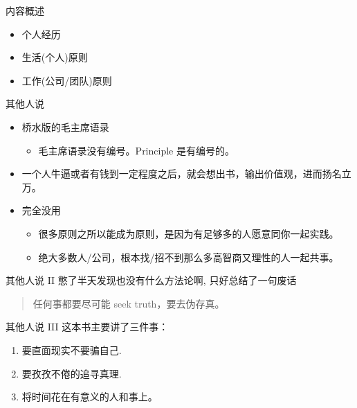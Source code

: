 \documentclass[presentation, bigger]{beamer}
\begin{document}
\begin{frame}[label={sec:orga9412aa}]{内容概述}
\begin{itemize}
\item 个人经历
\item 生活(个人)原则
\item 工作(公司/团队)原则
\end{itemize}
\end{frame}

\begin{frame}[label={sec:org32fb1e5}]{其他人说}
\begin{itemize}
\item 桥水版的毛主席语录
\begin{itemize}
\item 毛主席语录没有编号。Principle 是有编号的。
\end{itemize}

\item 一个人牛逼或者有钱到一定程度之后，就会想出书，输出价值观，进而扬名立万。

\item 完全没用
\begin{itemize}
\item 很多原则之所以能成为原则，是因为有足够多的人愿意同你一起实践。
\item 绝大多数人/公司，根本找/招不到那么多高智商又理性的人一起共事。
\end{itemize}
\end{itemize}
\end{frame}

\begin{frame}[label={sec:org1bd82e0}]{其他人说 II}
憋了半天发现也没有什么方法论啊, 只好总结了一句废话

\begin{quote}
\alert{任何事都要尽可能 seek truth，要去伪存真。}
\end{quote}
\end{frame}

\begin{frame}[label={sec:org56e6d64}]{其他人说 III}
这本书主要讲了三件事：

\begin{enumerate}
\item 要直面现实不要骗自己.
\item 要孜孜不倦的追寻真理.
\item 将时间花在有意义的人和事上。
\end{enumerate}
\end{frame}
\end{document}
